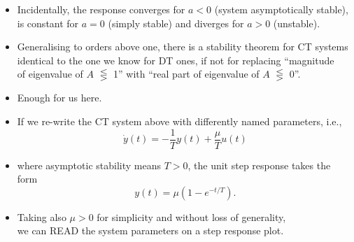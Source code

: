 \begin{frame}
\myPause
 \begin{itemize}[<+-| alert@+>]
 \item Incidentally, the response converges for $a<0$ (system asymptotically stable),\\
       is constant for $a=0$ (simply stable) and diverges for $a>0$ (unstable).
 \item Generalising to orders above one, there is a stability theorem for CT systems\\
       identical to the one we know for DT ones, if not for replacing ``magnitude\\
       of eigenvalue of $A$ $\lesseqgtr$ 1'' with ``real part of eigenvalue of $A$ $\lesseqgtr$ 0''.\\
 \item Enough for us here.
 \end{itemize}
\end{frame}

\begin{frame}
\myPause
 \begin{itemize}[<+-| alert@+>]
 \item If we re-write the CT system above with differently named parameters, i.e.,
       \begin{displaymath}
        \dot{y}(t) = -\frac{1}{T}y(t) + \frac{\mu}{T} u(t)
       \end{displaymath}
 \item[] where asymptotic stability means $T>0$, the unit step response takes the form
       \begin{displaymath}
        y(t) = \mu \left( 1-e^{-t/T} \right).
       \end{displaymath}
 \item Taking also $\mu>0$ for simplicity and without loss of generality,\\
       we can READ the system parameters on a step response plot.
 \end{itemize}
\end{frame}

